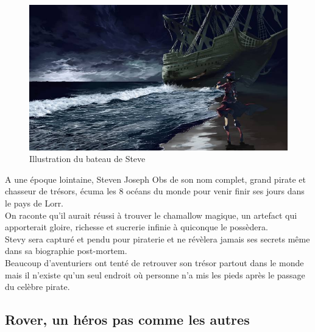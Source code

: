 \documentclass[a4paper 12pts]{article}
\begin{document}
\begin{figure}[h]
  	\includegraphics[width=350pt]{Illustration/Steve.jpg}
	\caption{Illustration du bateau de Steve}
\end{figure}

\vspace{1cm}

A une époque lointaine, Steven Joseph Obs de son nom complet, grand pirate et chasseur de trésors, écuma les 8 océans du monde pour venir finir ses jours dans le pays de Lorr.\\
On raconte qu'il aurait réussi à trouver le chamallow magique, un artefact qui apporterait gloire, richesse et sucrerie infinie à quiconque le possèdera.\\
Stevy sera capturé et pendu pour piraterie et ne révèlera jamais ses secrets même dans sa biographie post-mortem.\\
Beaucoup d'aventuriers ont tenté de retrouver son trésor partout dans le monde mais il n'existe qu'un seul endroit où personne n'a mis les pieds après le passage du celèbre pirate.



\newpage

\subsection{Rover, un héros pas comme les autres}

\vspace{1cm}
\end{document}
